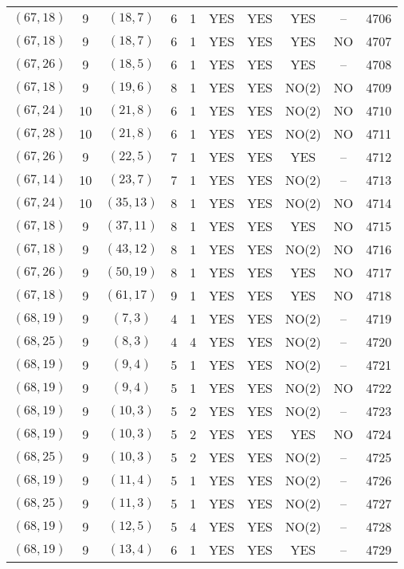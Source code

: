 \begin{longtable}{|c|c|c|c|c|c|c|c|c|c|}
$(67, 18)$ & 9 & $(18, 7)$ & 6 & 1 & YES & YES & YES & -- & 4706\\
$(67, 18)$ & 9 & $(18, 7)$ & 6 & 1 & YES & YES & YES & NO & 4707\\
$(67, 26)$ & 9 & $(18, 5)$ & 6 & 1 & YES & YES & YES & -- & 4708\\
$(67, 18)$ & 9 & $(19, 6)$ & 8 & 1 & YES & YES & NO(2) & NO & 4709\\
$(67, 24)$ & 10 & $(21, 8)$ & 6 & 1 & YES & YES & NO(2) & NO & 4710\\
$(67, 28)$ & 10 & $(21, 8)$ & 6 & 1 & YES & YES & NO(2) & NO & 4711\\
$(67, 26)$ & 9 & $(22, 5)$ & 7 & 1 & YES & YES & YES & -- & 4712\\
$(67, 14)$ & 10 & $(23, 7)$ & 7 & 1 & YES & YES & NO(2) & -- & 4713\\
$(67, 24)$ & 10 & $(35, 13)$ & 8 & 1 & YES & YES & NO(2) & NO & 4714\\
$(67, 18)$ & 9 & $(37, 11)$ & 8 & 1 & YES & YES & YES & NO & 4715\\
$(67, 18)$ & 9 & $(43, 12)$ & 8 & 1 & YES & YES & NO(2) & NO & 4716\\
$(67, 26)$ & 9 & $(50, 19)$ & 8 & 1 & YES & YES & YES & NO & 4717\\
$(67, 18)$ & 9 & $(61, 17)$ & 9 & 1 & YES & YES & YES & NO & 4718\\
$(68, 19)$ & 9 & $(7, 3)$ & 4 & 1 & YES & YES & NO(2) & -- & 4719\\
$(68, 25)$ & 9 & $(8, 3)$ & 4 & 4 & YES & YES & NO(2) & -- & 4720\\
$(68, 19)$ & 9 & $(9, 4)$ & 5 & 1 & YES & YES & NO(2) & -- & 4721\\
$(68, 19)$ & 9 & $(9, 4)$ & 5 & 1 & YES & YES & NO(2) & NO & 4722\\
$(68, 19)$ & 9 & $(10, 3)$ & 5 & 2 & YES & YES & NO(2) & -- & 4723\\
$(68, 19)$ & 9 & $(10, 3)$ & 5 & 2 & YES & YES & YES & NO & 4724\\
$(68, 25)$ & 9 & $(10, 3)$ & 5 & 2 & YES & YES & NO(2) & -- & 4725\\
$(68, 19)$ & 9 & $(11, 4)$ & 5 & 1 & YES & YES & NO(2) & -- & 4726\\
$(68, 25)$ & 9 & $(11, 3)$ & 5 & 1 & YES & YES & NO(2) & -- & 4727\\
$(68, 19)$ & 9 & $(12, 5)$ & 5 & 4 & YES & YES & NO(2) & -- & 4728\\
$(68, 19)$ & 9 & $(13, 4)$ & 6 & 1 & YES & YES & YES & -- & 4729\\

\end{longtable}
